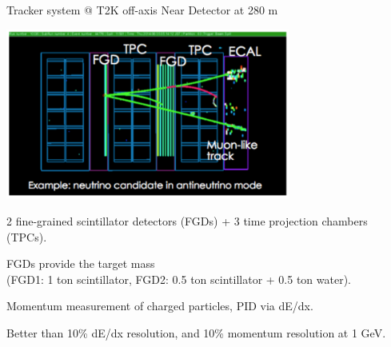 %
%
%
\begin{frame}{Tracker system @ T2K off-axis Near Detector at 280 m}

  \begin{center}
   \includegraphics[width=0.70\textwidth]{./images/3nu/accelerator/t2k/nd280_tracker_event.png}
  \end{center}

  \begin{itemize}
   {\scriptsize
   \item 2 fine-grained scintillator detectors (FGDs) + 3 time projection chambers (TPCs).
   \item FGDs provide the target mass\\ (FGD1: 1 ton scintillator, FGD2: 0.5 ton scintillator + 0.5 ton water).
   \item Momentum measurement of charged particles, PID via dE/dx.
   \item Better than 10\% dE/dx resolution, and 10\% momentum resolution at 1 GeV.\\
   }
  \end{itemize}

\end{frame}

